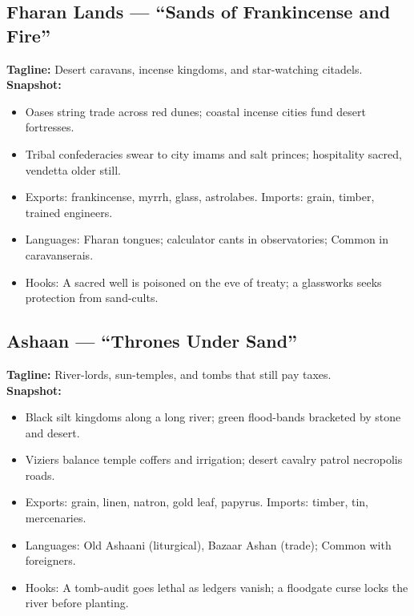 \documentclass[11pt]{book}
\begin{document}
\subsection*{Fharan Lands — “Sands of Frankincense and Fire”}
\textbf{Tagline:} Desert caravans, incense kingdoms, and star-watching citadels.\\
\textbf{Snapshot:}
\begin{itemize}
  \item Oases string trade across red dunes; coastal incense cities fund desert fortresses.
  \item Tribal confederacies swear to city imams and salt princes; hospitality sacred, vendetta older still.
  \item Exports: frankincense, myrrh, glass, astrolabes. Imports: grain, timber, trained engineers.
  \item Languages: Fharan tongues; calculator cants in observatories; Common in caravanserais.
  \item Hooks: A sacred well is poisoned on the eve of treaty; a glassworks seeks protection from sand-cults.
\end{itemize}

\subsection*{Ashaan — “Thrones Under Sand”}
\textbf{Tagline:} River-lords, sun-temples, and tombs that still pay taxes.\\
\textbf{Snapshot:}
\begin{itemize}
  \item Black silt kingdoms along a long river; green flood-bands bracketed by stone and desert.
  \item Viziers balance temple coffers and irrigation; desert cavalry patrol necropolis roads.
  \item Exports: grain, linen, natron, gold leaf, papyrus. Imports: timber, tin, mercenaries.
  \item Languages: Old Ashaani (liturgical), Bazaar Ashan (trade); Common with foreigners.
  \item Hooks: A tomb-audit goes lethal as ledgers vanish; a floodgate curse locks the river before planting.
\end{itemize}
\end{document}
